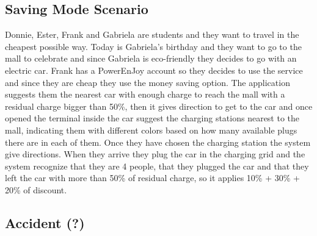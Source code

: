 \subsection{Saving Mode Scenario}
Donnie, Ester, Frank and Gabriela are students and they want to travel in the cheapest possible way. Today is Gabriela's birthday and they want to go to the mall to celebrate and since Gabriela is eco-friendly they decides to go with an electric car. Frank has a PowerEnJoy account so they decides to use the service and since they are cheap they use the money saving option. The application suggests them the nearest car with enough charge to reach the mall with a residual charge bigger than 50\%, then it gives direction to get to the car and once opened the terminal inside the car suggest the charging stations nearest to the mall, indicating them with different colors based on how many available plugs there are in each of them. Once they have chosen the charging station the system give directions. When they arrive  they plug the car in the charging grid and the system recognize that they are 4 people, that they plugged the car and that they left the car with more than 50\% of residual charge, so it applies 10\% + 30\% + 20\% of discount.
\subsection{Accident (?)}


